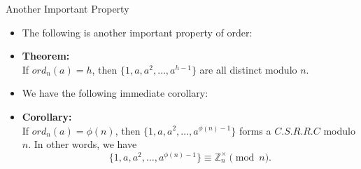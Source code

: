 \documentclass[ %
 usenames,dvipsnames,
aspectratio=169,11pt ]{beamer}
\newenvironment{stepitemize}{\begin{itemize}[<+->]}{\end{itemize} }
\newcommand{\Z}{\mathbb{Z}}
\begin{document}
\begin{frame}{Another Important Property}
\begin{stepitemize}
\item The following is another important property of order:
\item {\bf Theorem:}\\
If $ord_n(a)=h$, then $\{1,a,a^2, \dots, a^{h-1}\}$ are all distinct modulo $n$.

\item We have the following immediate corollary:
\item {\bf Corollary:}\\
If $ord_n(a)=\phi(n)$, then $\{1,a, a^2, \dots, a^{\phi(n)-1}\}$ forms a $C.S.R.R.C$ modulo $n$. In other words, we have
$$\{1,a, a^2, \dots, a^{\phi(n)-1}\} \equiv \Z_n^{\times} \pmod{n}.$$

\end{stepitemize}

\end{frame}
\end{document}
